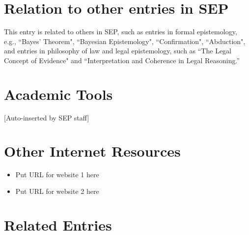 \documentclass{article}
\begin{document}
\section{Relation to other entries in SEP}


This entry is related to others in SEP, such as entries in formal epistemology, e.g., ``Bayes' Theorem", ``Bayesian Epistemology", ``Confirmation",  ``Abduction", and entries in philosophy of law and legal epistemology, such as 
``The Legal Concept of Evidence" and ``Interpretation and Coherence in Legal Reasoning.''

















\section*{Academic Tools}

[Auto-inserted by SEP staff]

\section*{Other Internet Resources}

\begin{itemize}

\item Put URL for website 1 here

\item Put URL for website 2 here

\end{itemize}


\section*{Related Entries}
\end{document}
